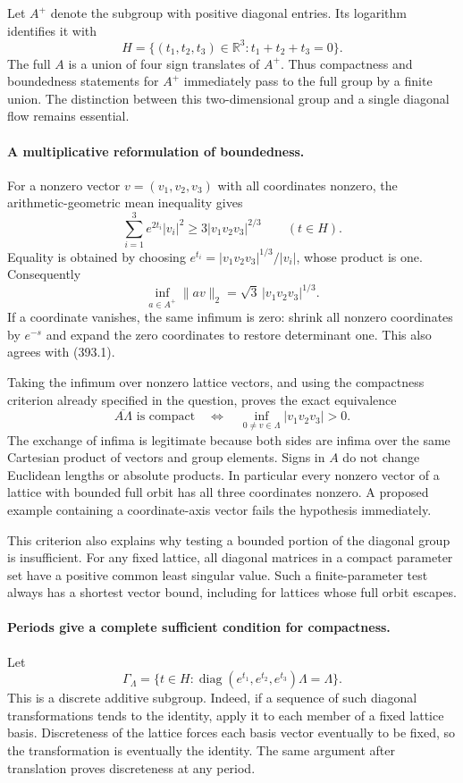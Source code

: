 \documentclass[11pt]{article}
\begin{document}
Let $A^+$ denote the subgroup with positive diagonal entries. Its
logarithm identifies it with
\[
 H=\{(t_1,t_2,t_3)\in\mathbb R^3:t_1+t_2+t_3=0\}.
\]
The full $A$ is a union of four sign translates of $A^+$. Thus
compactness and boundedness statements for $A^+$ immediately pass
to the full group by a finite union. The distinction between this
two-dimensional group and a single diagonal flow remains essential.

\paragraph{A multiplicative reformulation of boundedness.}
For a nonzero vector $v=(v_1,v_2,v_3)$ with all coordinates nonzero,
the arithmetic-geometric mean inequality gives
\[
 \sum_{i=1}^3e^{2t_i}|v_i|^2
       \geq3|v_1v_2v_3|^{2/3}\qquad(t\in H).
\]
Equality is obtained by choosing
$e^{t_i}=|v_1v_2v_3|^{1/3}/|v_i|$, whose product is one.
Consequently
\[
 \inf_{a\in A^+}\|av\|_2=\sqrt3\,|v_1v_2v_3|^{1/3}.
 \tag{393.1}
\]
If a coordinate vanishes, the same infimum is zero: shrink all
nonzero coordinates by $e^{-s}$ and expand the zero coordinates
to restore determinant one. This also agrees with (393.1).

Taking the infimum over nonzero lattice vectors, and using the
compactness criterion already specified in the question, proves
the exact equivalence
\[
 \overline{A\Lambda}\text{ is compact}
 \quad\Longleftrightarrow\quad
 \inf_{0\ne v\in\Lambda}|v_1v_2v_3|>0.
 \tag{393.2}
\]
The exchange of infima is legitimate because both sides are infima
over the same Cartesian product of vectors and group elements.
Signs in $A$ do not change Euclidean lengths or absolute products.
In particular every nonzero vector of a lattice with bounded full
orbit has all three coordinates nonzero. A proposed example containing
a coordinate-axis vector fails the hypothesis immediately.

This criterion also explains why testing a bounded portion of the
diagonal group is insufficient. For any fixed lattice, all diagonal
matrices in a compact parameter set have a positive common least
singular value. Such a finite-parameter test always has a shortest
vector bound, including for lattices whose full orbit escapes.

\paragraph{Periods give a complete sufficient condition for compactness.}
Let
\[
 \Gamma_\Lambda=\{t\in H:
       \operatorname{diag}(e^{t_1},e^{t_2},e^{t_3})\Lambda=\Lambda\}.
\]
This is a discrete additive subgroup. Indeed, if a sequence of such
diagonal transformations tends to the identity, apply it to each
member of a fixed lattice basis. Discreteness of the lattice forces
each basis vector eventually to be fixed, so the transformation is
eventually the identity. The same argument after translation proves
discreteness at any period.
\end{document}
